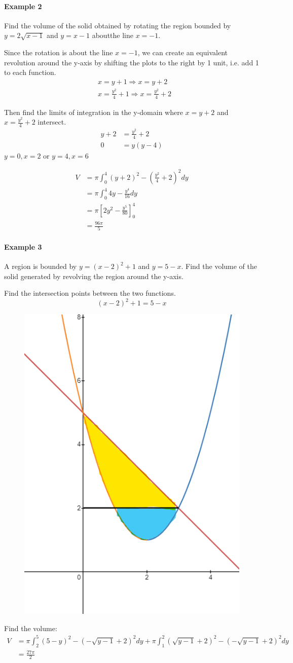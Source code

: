 \documentclass[12pt]{article}
\begin{document}
\paragraph{Example 2}
Find the volume of the solid obtained by rotating the region bounded by $y = 2\sqrt{x-1}$ and $y = x-1$ aboutthe line $x = -1$.

Since the rotation is about the line $x = -1$, we can create an equivalent revolution around the y-axis by shifting the plots
to the right by 1 unit, i.e. add 1 to each function.
\begin{align*} 
     &x = y + 1 \Rightarrow x = y + 2 \\
     &x = \frac{y^2}{4} + 1 \Rightarrow x = \frac{y^2}{4} + 2
\end{align*}

Then find the limits of integration in the y-domain where $x = y + 2$ and $x = \frac{y^2}{4} + 2$ intersect.
\begin{align*} 
     y + 2 &= \frac{y^2}{4} + 2\\
     0 &= y(y - 4) 
\end{align*}
$y = 0, x = 2$ or $y = 4, x = 6$

\begin{align*} 
    V &= \pi \int_{0}^4 (y + 2)^2 - (\frac{y^2}{4} + 2)^2 dy \\
    &= \pi \int_0^4 4y - \frac{y^4}{16} dy \\
    &= \pi \left[ 2y^2 - \frac{y^5}{80} \right]_0^4 \\
    &= \frac{96\pi}{5} 
\end{align*}


\paragraph{Example 3}
A region is bounded by $y = (x - 2)^2 + 1$ and $y = 5 - x$. Find the
volume of the solid generated by revolving the region around the y-axis.

Find the intersection points between the two functions. 
\[
    (x - 2)^2 + 1 = 5 - x
\]

\begin{figure}[H]
    \centering
    \includegraphics[width = 0.3\linewidth]{Images/ex3 solid of rev.png}
\end{figure}
Find the volume:
\begin{align*} 
    V &= \pi \int_2^5 (5 - y)^2 - ( - \sqrt{y - 1} + 2)^2 dy + \pi \int_1^2 (\sqrt{y - 1} + 2)^2 - ( - \sqrt{y - 1} + 2)^2 dy \\
    &= \frac{27\pi}{2} 
\end{align*}
\end{document}
